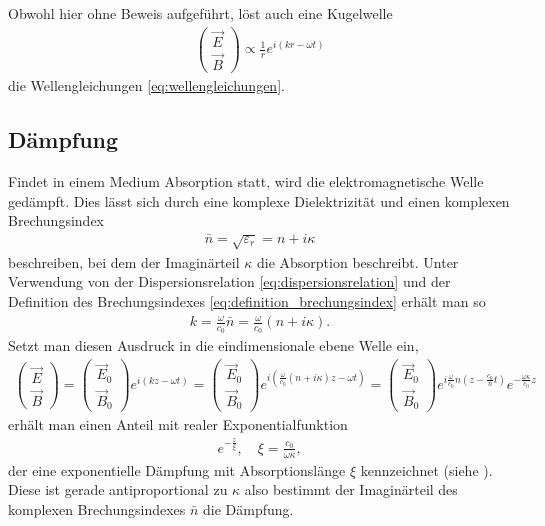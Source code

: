 Obwohl hier ohne Beweis aufgeführt, löst auch eine Kugelwelle
\begin{align*}
    \begin{pmatrix} \vec E \\ \vec B \end{pmatrix} \propto \frac{1}{r}e^{i(kr-\omega t)}
\end{align*}
die Wellengleichungen \eqref{eq:wellengleichungen}.




\subsection{Dämpfung}

Findet in einem Medium Absorption statt, wird die elektromagnetische Welle gedämpft.
Dies lässt sich durch eine komplexe Dielektrizität und einen komplexen Brechungsindex
\begin{align*}
    \bar{n} = \sqrt{\varepsilon_r} = n + i\kappa
\end{align*}
beschreiben, bei dem der Imaginärteil $\kappa$ die Absorption beschreibt.
Unter Verwendung von der Dispersionsrelation \eqref{eq:dispersionsrelation} und der Definition des Brechungsindexes \eqref{eq:definition_brechungsindex} erhält man so
\begin{align*}
    k=\frac{\omega}{c_0} \bar n = \frac{\omega}{c_0}(n+i\kappa).
\end{align*}
Setzt man diesen Ausdruck in die eindimensionale ebene Welle ein,
\begin{align*}
    \begin{pmatrix} \vec E \\ \vec B \end{pmatrix} = \begin{pmatrix} \vec E_0 \\ \vec B_0 \end{pmatrix} e^{i(kz-\omega t)} =\begin{pmatrix} \vec E_0 \\ \vec B_0 \end{pmatrix} e^{i\left(\frac{\omega}{c_0}(n+i\kappa) z-\omega t\right)}
    =\begin{pmatrix} \vec E_0 \\ \vec B_0 \end{pmatrix} e^{i\frac{\omega}{c_0}n \left( z- \frac{c_0}{n} t\right)}e^{-\frac{\omega\kappa}{c_0}z}
\end{align*}
erhält man einen Anteil mit realer Exponentialfunktion
\begin{align*}
    e^{-\frac{z}{\xi}}, \quad \xi = \frac{c_0}{\omega\kappa},
\end{align*}
der eine exponentielle Dämpfung mit Absorptionslänge $\xi$ kennzeichnet (siehe ).
Diese ist gerade antiproportional zu $\kappa$ \textendash{} also bestimmt der Imaginärteil des komplexen Brechungsindexes $\bar n$ die Dämpfung.


